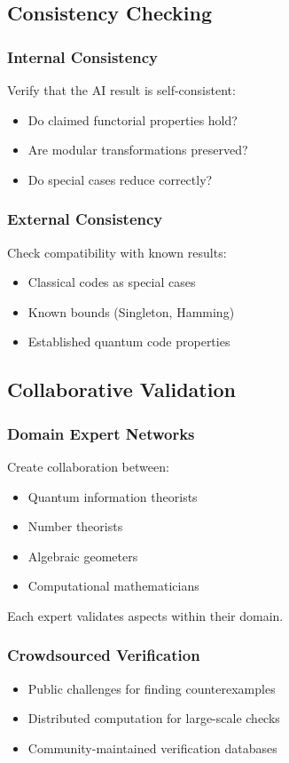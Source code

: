 \documentclass[11pt,a4paper]{article}
\begin{document}
\subsection{Consistency Checking}

\subsubsection{Internal Consistency}
Verify that the AI result is self-consistent:
\begin{itemize}
\item Do claimed functorial properties hold?
\item Are modular transformations preserved?
\item Do special cases reduce correctly?
\end{itemize}

\subsubsection{External Consistency}
Check compatibility with known results:
\begin{itemize}
\item Classical codes as special cases
\item Known bounds (Singleton, Hamming)
\item Established quantum code properties
\end{itemize}

\subsection{Collaborative Validation}

\subsubsection{Domain Expert Networks}
Create collaboration between:
\begin{itemize}
\item Quantum information theorists
\item Number theorists
\item Algebraic geometers
\item Computational mathematicians
\end{itemize}

Each expert validates aspects within their domain.

\subsubsection{Crowdsourced Verification}
\begin{itemize}
\item Public challenges for finding counterexamples
\item Distributed computation for large-scale checks
\item Community-maintained verification databases
\end{itemize}
\end{document}
